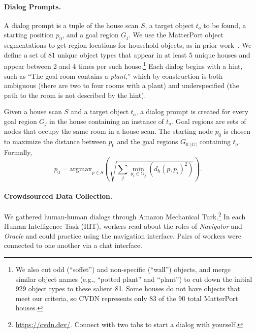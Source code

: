 \documentclass{article}
\newcommand{\dataset}{CVDN}
\newcommand{\nav}{\textit{Navigator}}
\newcommand{\ora}{\textit{Oracle}}
\begin{document}
\paragraph{Dialog Prompts.}
A dialog prompt is a tuple of the house scan $S$, a target object $t_o$ to be found, a starting position $p_0$, and a goal region $G_j$.
We use the MatterPort object segmentations to get region locations for household objects, as in prior work~\cite{nguyen:cvpr19}.
We define a set of 81 unique object types that appear in at least 5 unique houses and appear between 2 and 4 times per such house.\footnote{We also cut odd (``soffet'') and non-specific (``wall'') objects, and merge similar object names (e.g., ``potted plant'' and ``plant'') to cut down the initial 929 object types to these salient 81. Some houses do not have objects that meet our criteria, so \dataset{} represents only 83 of the 90 total MatterPort houses.}
Each dialog begins with a hint, such as ``The goal room contains a \textit{plant},'' which by construction is both ambiguous (there are two to four rooms with a plant) and underspecified (the path to the room is not described by the hint).

Given a house scan $S$ and a target object $t_o$, a dialog prompt is created for every goal region $G_j$ in the house containing an instance of $t_o$.
Goal regions are sets of nodes that occupy the same room in a house scan.
The starting node $p_0$ is chosen to maximize the distance between $p_0$ and the goal regions $G_{0:|G|}$ containing $t_o$.
Formally,
\begin{equation*}
    p_0 = \text{argmax}_{p\in S}\left(\sqrt{\sum_{j}{\min_{p_i\in G_j}(d_h(p, p_i)^2)}}\right).
\end{equation*}

\paragraph{Crowdsourced Data Collection.}
We gathered human-human dialogs through Amazon Mechanical Turk.\footnote{\url{https://cvdn.dev/}. Connect with two tabs to start a dialog with yourself.}
In each Human Intelligence Task (HIT), workers read about the roles of \nav{} and \ora{} and could practice using the navigation interface.
Pairs of workers were connected to one another via a chat interface.
\end{document}
